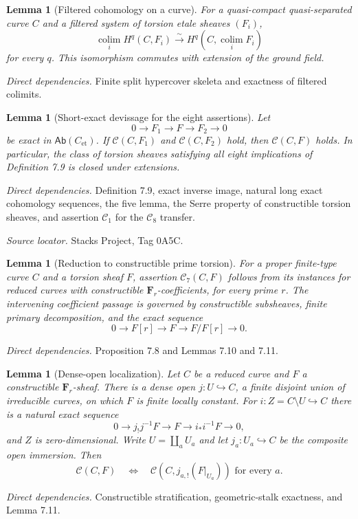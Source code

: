 \documentclass[10pt]{article}
\newtheorem{lemma}[theorem]{Lemma}
\theoremstyle{definition}
\newcommand{\Ab}{\mathsf{Ab}}
\newcommand{\colim}{\operatorname*{colim}}
\newcommand{\F}{\mathbf F}
\newcommand{\Et}{\mathrm{et}}
\newcommand{\deps}[1]{\par\smallskip\textit{Direct dependencies.} #1\par}
\newcommand{\sources}[1]{\par\textit{Source locator.} #1\par}
\begin{document}
\begin{lemma}[Filtered cohomology on a curve]
For a quasi-compact quasi-separated curve $C$ and a filtered system of
torsion etale sheaves $(F_i)$,
\[
 \colim_iH^q(C,F_i)\xrightarrow{\sim}
 H^q(C,\colim_iF_i)
\]
for every $q$.  This isomorphism commutes with extension of the ground
field.
\end{lemma}
\deps{Finite split hypercover skeleta and exactness of filtered colimits.}

\begin{lemma}[Short-exact devissage for the eight assertions]
Let
\[
 0\longrightarrow F_1\longrightarrow F\longrightarrow F_2
 \longrightarrow0
\]
be exact in $\Ab(C_{\Et})$.  If $\mathcal C(C,F_1)$ and
$\mathcal C(C,F_2)$ hold, then $\mathcal C(C,F)$ holds.  In particular,
the class of torsion sheaves satisfying all eight implications of
Definition 7.9 is closed under extensions.
\end{lemma}
\deps{Definition 7.9, exact inverse image, natural long exact cohomology
sequences, the five lemma, the Serre property of constructible torsion
sheaves, and assertion $\mathcal C_1$ for the $\mathcal C_8$ transfer.}
\sources{Stacks Project, Tag 0A5C.}

\begin{lemma}[Reduction to constructible prime torsion]
For a proper finite-type curve $C$ and a torsion sheaf $F$, assertion
$\mathcal C_7(C,F)$ follows from its instances for reduced curves with
constructible $\F_r$-coefficients, for every prime $r$.  The intervening
coefficient passage is governed by constructible subsheaves, finite
primary decomposition, and the exact sequence
\[
 0\to F[r]\to F\to F/F[r]\to0.
\]
\end{lemma}
\deps{Proposition 7.8 and Lemmas 7.10 and 7.11.}

\begin{lemma}[Dense-open localization]
Let $C$ be a reduced curve and $F$ a constructible $\F_r$-sheaf.  There is
a dense open $j:U\hookrightarrow C$, a finite disjoint union of irreducible
curves, on which $F$ is finite locally constant.  For
$i:Z=C\setminus U\hookrightarrow C$ there is a natural exact sequence
\[
 0\to j_!j^{-1}F\to F\to i_*i^{-1}F\to0,
\]
and $Z$ is zero-dimensional.  Write $U=\coprod_aU_a$ and let
$j_a:U_a\hookrightarrow C$ be the composite open immersion.  Then
\[
 \mathcal C(C,F)\quad\Longleftrightarrow\quad
 \mathcal C(C,j_{a,!}(F|_{U_a}))\text{ for every }a.
\]
\end{lemma}
\deps{Constructible stratification, geometric-stalk exactness, and Lemma
7.11.}
\end{document}
